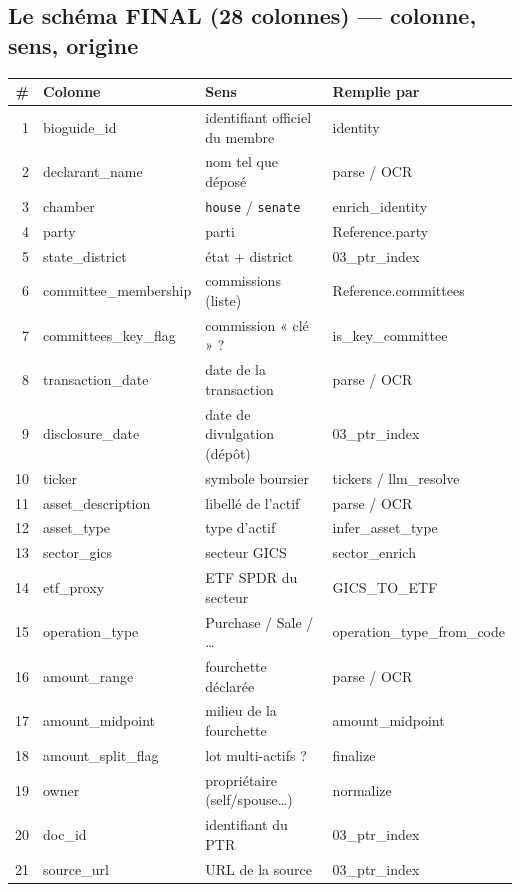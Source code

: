 \documentclass[11pt,a4paper]{article}
\newcommand{\co}[1]{\texttt{\small #1}}
\begin{document}
\subsection{Le schéma FINAL (28 colonnes) — colonne, sens, origine}
{\footnotesize
\begin{longtable}{r >{\ttfamily}p{3.3cm} p{8.4cm} >{\ttfamily\scriptsize}p{3.2cm}}
\toprule
\# & \normalfont\bfseries Colonne & \bfseries Sens & \normalfont\bfseries Remplie par \\
\midrule\endhead
1 & bioguide_id & identifiant officiel du membre & identity \\
2 & declarant_name & nom tel que déposé & parse / OCR \\
3 & chamber & \co{house} / \co{senate} & enrich_identity \\
4 & party & parti & Reference.party \\
5 & state_district & état + district & 03\_ptr\_index \\
6 & committee_membership & commissions (liste) & Reference.committees \\
7 & committees_key_flag & commission « clé » ? & is_key_committee \\
8 & transaction_date & date de la transaction & parse / OCR \\
9 & disclosure_date & date de divulgation (dépôt) & 03\_ptr\_index \\
10 & ticker & symbole boursier & tickers / llm_resolve \\
11 & asset_description & libellé de l'actif & parse / OCR \\
12 & asset_type & type d'actif & infer_asset_type \\
13 & sector_gics & secteur GICS & sector_enrich \\
14 & etf_proxy & ETF SPDR du secteur & GICS\_TO\_ETF \\
15 & operation_type & Purchase / Sale / … & operation_type_from_code \\
16 & amount_range & fourchette déclarée & parse / OCR \\
17 & amount_midpoint & milieu de la fourchette & amount_midpoint \\
18 & amount_split_flag & lot multi-actifs ? & finalize \\
19 & owner & propriétaire (self/spouse…) & normalize \\
20 & doc_id & identifiant du PTR & 03\_ptr\_index \\
21 & source_url & URL de la source & 03\_ptr\_index \\

\end{longtable}}
\end{document}

